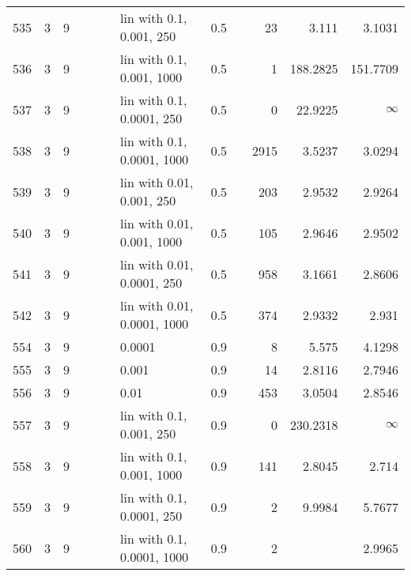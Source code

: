 \begin{longtable}{lrrrrrlrrrrr}
  535 &       3 & 9 &   &   &   &    lin with 0.1, 0.001, 250 &      0.5 &        &      23 &                  3.111 &                 3.1031 \\
  536 &       3 & 9 &   &   &   &   lin with 0.1, 0.001, 1000 &      0.5 &        &       1 &               188.2825 &               151.7709 \\
  537 &       3 & 9 &   &   &   &   lin with 0.1, 0.0001, 250 &      0.5 &        &       0 &                22.9225 &               $\infty$ \\
  538 &       3 & 9 &   &   &   &  lin with 0.1, 0.0001, 1000 &      0.5 &        &    2915 &                 3.5237 &                 3.0294 \\
  539 &       3 & 9 &   &   &   &   lin with 0.01, 0.001, 250 &      0.5 &        &     203 &                 2.9532 &                 2.9264 \\
  540 &       3 & 9 &   &   &   &  lin with 0.01, 0.001, 1000 &      0.5 &        &     105 &                 2.9646 &                 2.9502 \\
  541 &       3 & 9 &   &   &   &  lin with 0.01, 0.0001, 250 &      0.5 &        &     958 &                 3.1661 &                 2.8606 \\
  542 &       3 & 9 &   &   &   & lin with 0.01, 0.0001, 1000 &      0.5 &        &     374 &                 2.9332 &                  2.931 \\
  554 &       3 & 9 &   &   &   &                      0.0001 &      0.9 &        &       8 &                  5.575 &                 4.1298 \\
  555 &       3 & 9 &   &   &   &                       0.001 &      0.9 &        &      14 &                 2.8116 &                 2.7946 \\
  556 &       3 & 9 &   &   &   &                        0.01 &      0.9 &        &     453 &                 3.0504 &                 2.8546 \\
  557 &       3 & 9 &   &   &   &    lin with 0.1, 0.001, 250 &      0.9 &        &       0 &               230.2318 &               $\infty$ \\
  558 &       3 & 9 &   &   &   &   lin with 0.1, 0.001, 1000 &      0.9 &        &     141 &                 2.8045 &                  2.714 \\
  559 &       3 & 9 &   &   &   &   lin with 0.1, 0.0001, 250 &      0.9 &        &       2 &                 9.9984 &                 5.7677 \\
  560 &       3 & 9 &   &   &   &  lin with 0.1, 0.0001, 1000 &      0.9 &        &       2 &                        &                 2.9965 \\

\end{longtable}
